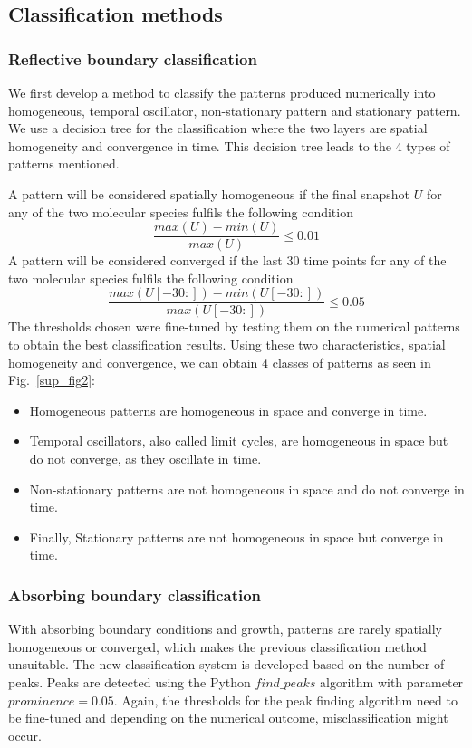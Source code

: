 \subsection*{Classification methods}

\subsubsection*{Reflective boundary classification}
We first develop a method to classify the patterns produced numerically into homogeneous, temporal oscillator, non-stationary pattern and stationary pattern.
We use a decision tree for the classification where the two layers are spatial homogeneity and convergence in time.
This decision tree leads to the 4 types of patterns mentioned.

A pattern will be considered spatially homogeneous if the final snapshot $U$ for any of the two molecular species fulfils the following condition
\begin{equation}
    \frac{max(U) - min(U)}{max(U)} \leq 0.01
\end{equation}
A pattern will be considered converged if the last 30 time points for any of the two molecular species fulfils the following condition
\begin{equation}
    \frac{max(U[-30:]) - min(U[-30:])}{max(U[-30:])} \leq 0.05
\end{equation}
The thresholds chosen were fine-tuned by testing them on the numerical patterns to obtain the best classification results.
Using these two characteristics, spatial homogeneity and convergence, we can obtain 4 classes of patterns as seen in Fig.~\ref{sup_fig2}:
\begin{itemize}
    \item Homogeneous patterns are homogeneous in space and converge in time.
    \item Temporal oscillators, also called limit cycles, are homogeneous in space but do not converge, as they oscillate in time.
    \item Non-stationary patterns are not homogeneous in space and do not converge in time.
    \item Finally, Stationary patterns are not homogeneous in space but converge in time.
\end{itemize}
\subsubsection*{Absorbing boundary classification}
With absorbing boundary conditions and growth, patterns are rarely spatially homogeneous or converged, which makes the previous classification method unsuitable.
The new classification system is developed based on the number of peaks.
Peaks are detected using the Python $find\_peaks$ algorithm with parameter $prominence=0.05$.
Again, the thresholds for the peak finding algorithm need to be fine-tuned and depending on the numerical outcome, misclassification might occur.

